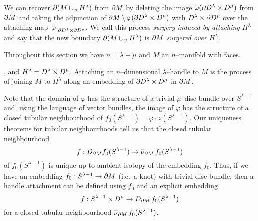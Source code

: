 \begin{defn}[Surgery]
	\label{def:surgery}
	We can recover $\partial (M\cup_\varphi H^\lambda)$ from $\partial M$ by deleting the image $\varphi(\partial D^\lambda\times D^\mu)$ from $\partial M$ and taking the adjunction of $\partial M\setminus \varphi(\partial D^\lambda\times D^\mu)$ with $D^\lambda\times\partial D^\mu$ over the attaching map $\left.\varphi\right|_{\partial D^\lambda\times\partial D^\mu}$.
	We call this process \emph{surgery induced by attaching $H^\lambda$} and say that the new boundary $\partial (M\cup_\varphi H^\lambda)$ is \emph{$\partial M$ surgered over $H^\lambda$}.
\end{defn}





















































Throughout this section we have $n=\lambda+\mu$ and $M$ an $n$--manifold with faces.




, and $H^\lambda=D^\lambda\times D^\mu$.
Attaching an $n$--dimensional $\lambda$--handle to $M$ is the process of joining $M$ to $H^\lambda$ along an embedding of $\partial D^\lambda\times D^\mu$ in $\partial M$. 





Note that the domain of $\varphi$ has the structure of a trivial $\mu$--disc bundle over $S^{\lambda-1}$ and, using the language of vector bundles, the image of $\varphi$ has the structure of a closed tubular neighbourhood of $f_0(S^{\lambda-1})=\varphi\comp z(S^{\lambda-1})$.
Our uniqueness theorems for tubular neighbourhoods tell us that the closed tubular neighbourhood
\[
	f:D_{\partial M}f_0(S^{\lambda-1})\to\overline{\nu}_{\partial M}\,f_0(S^{\lambda-1})
\]
of $f_0(S^{\lambda-1})$ is unique up to ambient isotopy of the embedding $f_0$.
Thus, if we have an embedding $f_0:S^{\lambda-1}\to \partial M$ (i.e.\ a knot) with trivial disc bundle, then a handle attachment can be defined using $f_0$ and an explicit embedding 
\[
	f: S^{\lambda-1}\times D^\mu\to D_{\partial M}\,f_0(S^{\lambda-1})
\]
for a closed tubular neighbourhood $\overline{\nu}_{\partial M}\,f_0(S^{\lambda-1})$.

